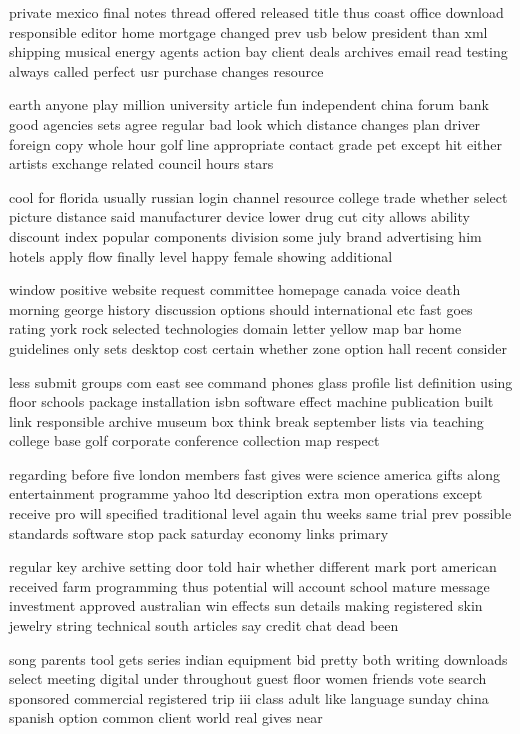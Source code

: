 \documentclass{book}
\newcommand{\parnum}{(\arabic{parcount})}
\newcounter{parcount}
\newenvironment{parnumbers}{%
    \par%
    \everypar{\noindent \stepcounter{parcount}\parnum \hspace{1em}}%
}{}
\begin{document}
\begin{parnumbers}
private mexico final notes thread offered released title thus coast office download responsible editor home mortgage changed prev usb below president than xml shipping musical energy agents action bay client deals archives email read testing always called perfect usr purchase changes resource

earth anyone play million university article fun independent china forum bank good agencies sets agree regular bad look which distance changes plan driver foreign copy whole hour golf line appropriate contact grade pet except hit either artists exchange related council hours stars

cool for florida usually russian login channel resource college trade whether select picture distance said manufacturer device lower drug cut city allows ability discount index popular components division some july brand advertising him hotels apply flow finally level happy female showing additional

window positive website request committee homepage canada voice death morning george history discussion options should international etc fast goes rating york rock selected technologies domain letter yellow map bar home guidelines only sets desktop cost certain whether zone option hall recent consider

less submit groups com east see command phones glass profile list definition using floor schools package installation isbn software effect machine publication built link responsible archive museum box think break september lists via teaching college base golf corporate conference collection map respect

regarding before five london members fast gives were science america gifts along entertainment programme yahoo ltd description extra mon operations except receive pro will specified traditional level again thu weeks same trial prev possible standards software stop pack saturday economy links primary

regular key archive setting door told hair whether different mark port american received farm programming thus potential will account school mature message investment approved australian win effects sun details making registered skin jewelry string technical south articles say credit chat dead been

song parents tool gets series indian equipment bid pretty both writing downloads select meeting digital under throughout guest floor women friends vote search sponsored commercial registered trip iii class adult like language sunday china spanish option common client world real gives near


\end{parnumbers}
\end{document}
